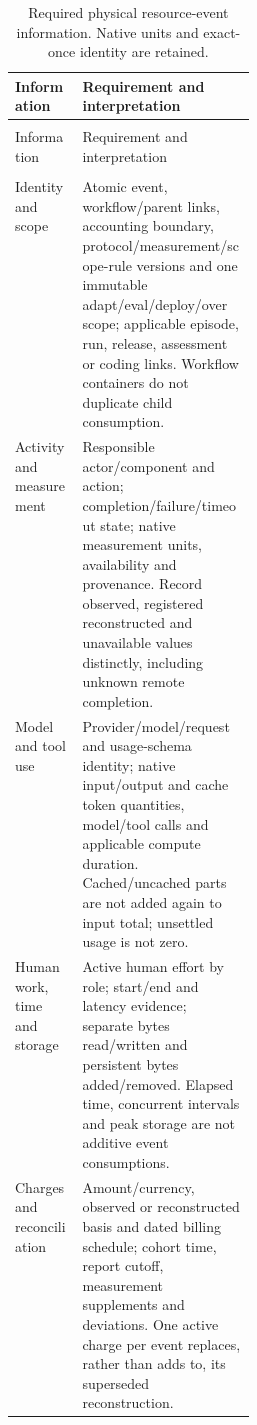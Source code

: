 \documentclass[10pt]{article} %
\providecommand{\1}{\mathbf{1}}  %
\theoremstyle{remark}
\theoremstyle{definition}
\begin{document}
\begingroup
\footnotesize
\renewcommand{\arraystretch}{1.13}
\setlength{\LTpre}{6pt}
\setlength{\LTpost}{8pt}
\setlength{\LTcapwidth}{\linewidth}
\begin{longtable}{@{}>{\raggedright\arraybackslash}p{0.28\linewidth}>{\raggedright\arraybackslash}p{}@{}}
\caption{Required physical resource-event information. Native units and exact-once identity are retained.}\label{tab:resource-event-ledger}\\
\toprule
Information & Requirement and interpretation \\
\midrule
\endfirsthead
\multicolumn{2}{@{}l}{\textit{Table \thetable\ continued}}\\
\toprule
Information & Requirement and interpretation \\
\midrule
\endhead
\midrule
\multicolumn{2}{r@{}}{\textit{Continued on next page}}\\
\endfoot
\bottomrule
\endlastfoot

Identity and scope & Atomic event, workflow/parent links, accounting boundary, protocol/measurement/scope-rule versions and one immutable adapt/eval/deploy/over scope; applicable episode, run, release, assessment or coding links. Workflow containers do not duplicate child consumption. \\
Activity and measurement & Responsible actor/component and action; completion/failure/timeout state; native measurement units, availability and provenance. Record observed, registered reconstructed and unavailable values distinctly, including unknown remote completion. \\
Model and tool use & Provider/model/request and usage-schema identity; native input/output and cache token quantities, model/tool calls and applicable compute duration. Cached/uncached parts are not added again to input total; unsettled usage is not zero. \\
Human work, time and storage & Active human effort by role; start/end and latency evidence; separate bytes read/written and persistent bytes added/removed. Elapsed time, concurrent intervals and peak storage are not additive event consumptions. \\
Charges and reconciliation & Amount/currency, observed or reconstructed basis and dated billing schedule; cohort time, report cutoff, measurement supplements and deviations. One active charge per event replaces, rather than adds to, its superseded reconstruction. \\
\end{longtable}
\endgroup
\end{document}
